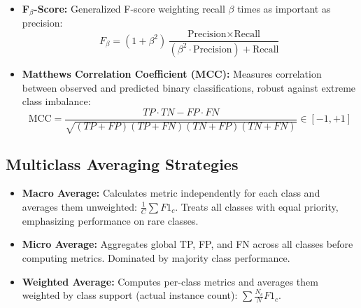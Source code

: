 \begin{itemize}
\begin{equation}
    \end{equation}
    \item \textbf{F$_\beta$-Score:} Generalized F-score weighting recall $\beta$ times as important as precision:
    \begin{equation}
    F_\beta = (1 + \beta^2) \frac{\text{Precision} \times \text{Recall}}{(\beta^2 \cdot \text{Precision}) + \text{Recall}}
    \end{equation}
    \item \textbf{Matthews Correlation Coefficient (MCC):} Measures correlation between observed and predicted binary classifications, robust against extreme class imbalance:
    \begin{equation}
    \text{MCC} = \frac{TP \cdot TN - FP \cdot FN}{\sqrt{(TP + FP)(TP + FN)(TN + FP)(TN + FN)}} \in [-1, +1]
    \end{equation}
\end{itemize}

\subsection{Multiclass Averaging Strategies}
\begin{itemize}
    \item \textbf{Macro Average:} Calculates metric independently for each class and averages them unweighted: $\frac{1}{C}\sum F1_c$. Treats all classes with equal priority, emphasizing performance on rare classes.
    \item \textbf{Micro Average:} Aggregates global TP, FP, and FN across all classes before computing metrics. Dominated by majority class performance.
    \item \textbf{Weighted Average:} Computes per-class metrics and averages them weighted by class support (actual instance count): $\sum \frac{N_c}{N} F1_c$.
\end{itemize}

